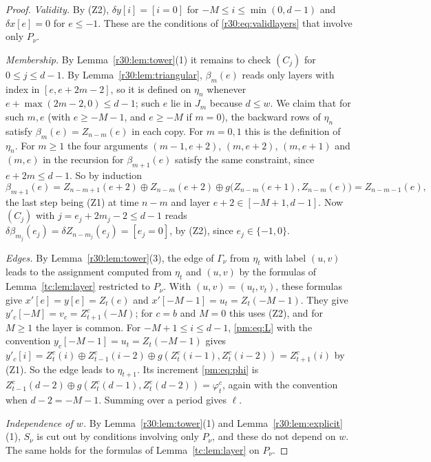 \begin{proof}
\emph{Validity.} By (Z2), $\delta y[i]=[i=0]$ for $-M\le i\le\min(0,d-1)$ and $\delta x[e]=0$ for $e\le-1$. These are the conditions of \eqref{r30:eq:validlayers} that involve only $P_\nu$.

\emph{Membership.} By Lemma~\ref{r30:lem:tower}(1) it remains to check $(C_j)$ for $0\le j\le d-1$. By Lemma~\ref{r30:lem:triangular}, $\beta_m(e)$ reads only layers with index in $[e,e+2m-2]$, so it is defined on $\eta_n$ whenever $e+\max(2m-2,0)\le d-1$; such $e$ lie in $J_m$ because $d\le w$. We claim that for such $m,e$ (with $e\ge-M-1$, and $e\ge-M$ if $m=0$), the backward rows of $\eta_n$ satisfy $\beta_m(e)=Z_{n-m}(e)$ in each copy. For $m=0,1$ this is the definition of $\eta_n$. For $m\ge1$ the four arguments $(m-1,e+2)$, $(m,e+2)$, $(m,e+1)$ and $(m,e)$ in the recursion for $\beta_{m+1}(e)$ satisfy the same constraint, since $e+2m\le d-1$. So by induction
\[
\beta_{m+1}(e)=Z_{n-m+1}(e+2)\oplus Z_{n-m}(e+2)\oplus g\bigl(Z_{n-m}(e+1),Z_{n-m}(e)\bigr)=Z_{n-m-1}(e),
\]
the last step being (Z1) at time $n-m$ and layer $e+2\in[-M+1,d-1]$. Now $(C_j)$ with $j=e_j+2m_j-2\le d-1$ reads $\delta\beta_{m_j}(e_j)=\delta Z_{n-m_j}(e_j)=[e_j=0]$, by (Z2), since $e_j\in\{-1,0\}$.

\emph{Edges.} By Lemma~\ref{r30:lem:tower}(3), the edge of $\Gamma_\nu$ from $\eta_t$ with label $(u,v)$ leads to the assignment computed from $\eta_t$ and $(u,v)$ by the formulas of Lemma~\ref{tc:lem:layer} restricted to $P_\nu$. With $(u,v)=(u_t,v_t)$, these formulas give $x'[e]=y[e]=Z_t(e)$ and $x'[-M-1]=u_t=Z_t(-M-1)$. They give $y'_c[-M]=v_c=Z^c_{t+1}(-M)$; for $c=b$ and $M=0$ this uses (Z2), and for $M\ge1$ the layer is common. For $-M+1\le i\le d-1$, \eqref{pm:eq:L} with the convention $y_c[-M-1]=u_t=Z_t(-M-1)$ gives $y'_c[i]=Z^c_t(i)\oplus Z^c_{t-1}(i-2)\oplus g(Z^c_t(i-1),Z^c_t(i-2))=Z^c_{t+1}(i)$ by (Z1). So the edge leads to $\eta_{t+1}$. Its increment \eqref{pm:eq:phi} is $Z^c_{t-1}(d-2)\oplus g(Z^c_t(d-1),Z^c_t(d-2))=\varphi^c_t$, again with the convention when $d-2=-M-1$. Summing over a period gives $\ell$.

\emph{Independence of $w$.} By Lemma~\ref{r30:lem:tower}(1) and Lemma~\ref{r30:lem:explicit}(1), $S_\nu$ is cut out by conditions involving only $P_\nu$, and these do not depend on $w$. The same holds for the formulas of Lemma~\ref{tc:lem:layer} on $P_\nu$.
\end{proof}

